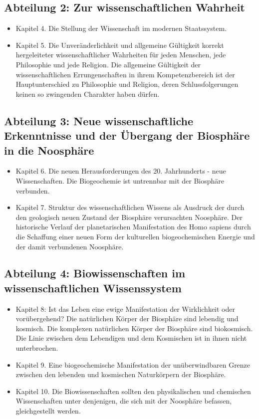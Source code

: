 \documentclass[11pt,a4paper]{article}
\begin{document}
\subsection*{Abteilung 2: Zur wissenschaftlichen Wahrheit}

\begin{itemize}
\item Kapitel 4.  Die Stellung der Wissenschaft im modernen Staatssystem. 

\item Kapitel 5.  Die Unveränderlichkeit und allgemeine Gültigkeit korrekt
  hergeleiteter wissenschaftlicher Wahrheiten für jeden Menschen, jede
  Philosophie und jede Religion. Die allgemeine Gültigkeit der
  wissenschaftlichen Errungenschaften in ihrem Kompetenzbereich ist der
  Hauptunterschied zu Philosophie und Religion, deren Schlussfolgerungen
  keinen so zwingenden Charakter haben dürfen.
\end{itemize}

\subsection*{Abteilung 3: Neue wissenschaftliche Erkenntnisse und der Übergang
  der Biosphäre in die Noosphäre}

\begin{itemize}
\item Kapitel 6.  Die neuen Herausforderungen des 20. Jahrhunderts - neue
  Wissenschaften. Die Biogeochemie ist untrennbar mit der Biosphäre verbunden.

\item Kapitel 7.  Struktur des wissenschaftlichen Wissens als Ausdruck der
  durch den geologisch neuen Zustand der Biosphäre verursachten Noosphäre. Der
  historische Verlauf der planetarischen Manifestation des Homo sapiens durch
  die Schaffung einer neuen Form der kulturellen biogeochemischen Energie und
  der damit verbundenen Noosphäre.
\end{itemize}

\subsection*{Abteilung 4: Biowissenschaften im wissenschaftlichen
  Wissenssystem} 

\begin{itemize}
\item Kapitel 8: Ist das Leben eine ewige Manifestation der Wirklichkeit oder
  vorübergehend? Die natürlichen Körper der Biosphäre sind lebendig und
  kosmisch. Die komplexen natürlichen Körper der Biosphäre sind
  biokosmisch. Die Linie zwischen dem Lebendigen und dem Kosmischen ist in
  ihnen nicht unterbrochen.

\item Kapitel 9.  Eine biogeochemische Manifestation der unüberwindbaren
  Grenze zwischen den lebenden und kosmischen Naturkörpern der Biosphäre.

\item Kapitel 10.  Die Biowissenschaften sollten den physikalischen und
  chemischen Wissenschaften unter denjenigen, die sich mit der Noosphäre
  befassen, gleichgestellt werden.
\end{itemize}
\end{document}
